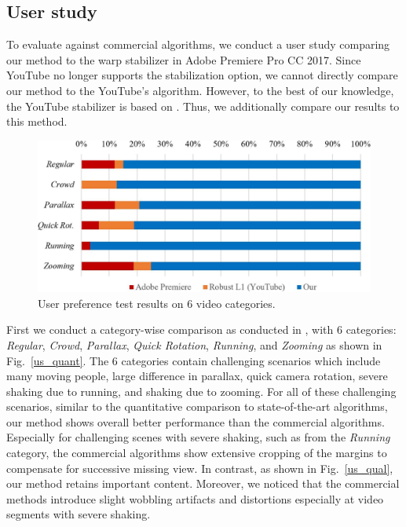 
\subsection{User study}
To evaluate against commercial algorithms, we conduct a user study comparing our method to the warp stabilizer in Adobe Premiere Pro CC 2017.
Since YouTube no longer supports the stabilization option, we cannot directly compare our method to the YouTube's algorithm. 
However, to the best of our knowledge, the YouTube stabilizer is based on \cite{grundmann2011auto}.
Thus, we additionally compare our results to this method.

\begin{figure}
	\includegraphics[width=1\linewidth,keepaspectratio]{us}
	\vspace{-5mm}
	\caption{User preference test results on 6 video categories.}
	\label{us}
	\vspace{-3mm}
\end{figure}

First we conduct a category-wise comparison as conducted in \cite{xu2018deep}, with 6 categories: \emph{Regular}, \emph{Crowd}, \emph{Parallax}, \emph{Quick Rotation}, \emph{Running}, and \emph{Zooming} as shown in Fig.~\ref{us_quant}.
The 6 categories contain challenging scenarios which include many moving people, large difference in parallax, quick camera rotation, severe shaking due to running, and shaking due to zooming.
For all of these challenging scenarios, similar to the quantitative comparison to state-of-the-art algorithms, our method shows overall better performance than the commercial algorithms. 
Especially for challenging scenes with severe shaking, such as from the \emph{Running} category, the commercial algorithms show extensive cropping of the margins to compensate for successive missing view.
In contrast, as shown in Fig.~\ref{us_qual}, our method retains important content.
Moreover, we noticed that the commercial methods introduce slight wobbling artifacts and distortions especially at video segments with severe shaking.


